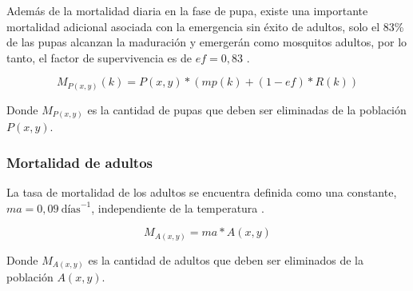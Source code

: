 Además de la mortalidad diaria en la fase de pupa, existe una importante mortalidad adicional
asociada con la emergencia sin éxito de adultos, solo el 83\%  de las pupas alcanzan la maduración
y emergerán como mosquitos adultos, por lo tanto, el factor de supervivencia es de $ef=0,83$
\cite{otero2006stochastic}.

\begin{equation}
    M_{P(x,y)}(k) = P(x,y) * (mp(k) + (1 - ef) * R(k))
\end{equation}

Donde $M_{P(x,y)}$ es la cantidad de pupas que deben ser eliminadas de la población $P(x,y)$.

\subsubsection{Mortalidad de adultos}
La tasa de mortalidad de los adultos se encuentra definida como una constante,
$ma = 0,09\ \text{días}^{-1}$, independiente de la temperatura \cite{otero2006stochastic}.

\begin{equation}
    M_{A(x,y)} = ma * A(x,y)
\end{equation}

Donde $M_{A(x,y)}$ es la cantidad de adultos que deben ser eliminados de la población $A(x,y)$.
